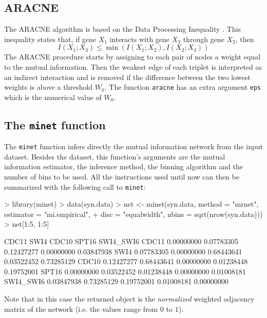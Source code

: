 \documentclass{article}
\newcommand{\Rfunction}[1]{{\texttt{#1}}}
\newcommand{\Robject}[1]{{\texttt{#1}}}
\begin{document}
\subsection{ARACNE}

The ARACNE algorithm is based on the Data Processing Inequality . This inequality states that, 
if gene $X_{1}$ interacts with gene $X_{3}$ through gene $X_{2}$, then $$I(X_{1};X_{3})\leq\min\left(I(X_{1};X_{2}),I(X_{2};X_{3})\right)$$
The ARACNE procedure starts by assigning to each pair of nodes a weight equal to the mutual information. 
Then the weakest edge of each triplet is interpreted as an indirect interaction and is removed if 
the difference between the two lowest weights is above a threshold $W_0$.
The function \Rfunction{aracne} has an extra argument \Robject{eps}
which is the numerical value of $W_0$.


\subsection{The \Rfunction{minet} function}
The \Rfunction{minet} function infers directly the mutual information network from the input dataset.
Besides the dataset, this function's arguments are the mutual information estimator, the inference method,
the binning algorithm and the number of bins to be used.
All the instructions used until now can then be summarized with the following call to \Rfunction{minet}:

\begin{Schunk}
\begin{Sinput}
> library(minet)
> data(syn.data)
> net <- minet(syn.data, method = "mrnet", estimator = "mi.empirical", 
+     disc = "equalwidth", nbins = sqrt(nrow(syn.data)))
> net[1:5, 1:5]
\end{Sinput}
\begin{Soutput}
               CDC11       SWI4      CDC10      SPT16  SWI4_SWI6
CDC11     0.00000000 0.07783305 0.12427277 0.00000000 0.03847938
SWI4      0.07783305 0.00000000 0.68443641 0.03522452 0.73285129
CDC10     0.12427277 0.68443641 0.00000000 0.01238448 0.19752001
SPT16     0.00000000 0.03522452 0.01238448 0.00000000 0.01008181
SWI4_SWI6 0.03847938 0.73285129 0.19752001 0.01008181 0.00000000
\end{Soutput}
\end{Schunk}
Note that in this case the returned object is the \emph{normalized} weighted 
adjacency matrix of the network (i.e. the values range from $0$ to $1$).

\end{document}
